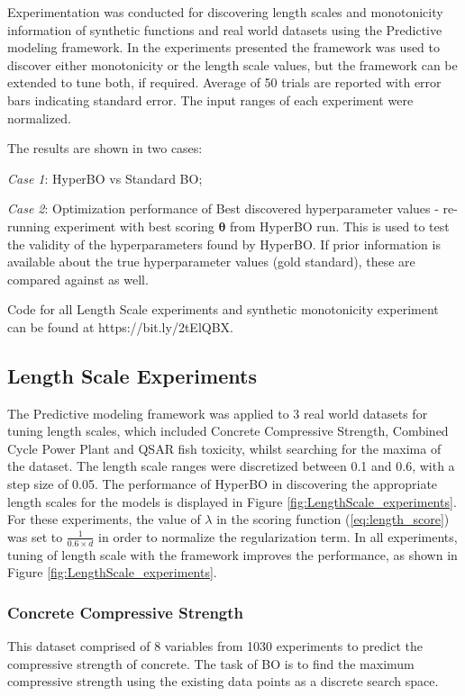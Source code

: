 Experimentation was conducted for discovering length scales and monotonicity information of synthetic functions and real world datasets using the Predictive modeling framework. In the experiments presented the framework was used to discover either monotonicity or the length scale values, but the framework can be extended to tune both, if required. Average of 50 trials are reported with error bars indicating standard error. The input ranges of each experiment were normalized. 

The results are shown in two cases: 

\textit{Case 1}: HyperBO vs Standard BO; 

\textit{Case 2}: Optimization performance of Best discovered hyperparameter values - re-running experiment with best scoring $\boldsymbol{\theta}$ from HyperBO run. This is used to test the validity of the hyperparameters found by HyperBO. If prior information is available about the true hyperparameter values (gold standard), these are compared against as well.

Code for all Length Scale experiments and synthetic monotonicity experiment can be found at https://bit.ly/2tElQBX. 
\subsection{Length Scale Experiments}
The Predictive modeling framework was applied to 3 real world datasets for tuning length scales, which included Concrete Compressive Strength, Combined Cycle Power Plant and QSAR fish toxicity, whilst searching for the maxima of the dataset. The length scale ranges were discretized between 0.1 and 0.6, with a step size of 0.05.  The performance of HyperBO in discovering the appropriate length scales for the models is displayed in Figure \ref{fig:LengthScale_experiments}. For these  experiments, the value of $\lambda$ in the scoring function (\ref{eq:length_score}) was set to $\frac{1}{ 0.6 \times d}$ in order to normalize the regularization term. In all experiments, tuning of length scale with the framework improves the performance, as shown in Figure \ref{fig:LengthScale_experiments}.

\subsubsection{Concrete Compressive Strength}
This dataset comprised of 8 variables from 1030 experiments to predict the compressive strength of concrete. The task of BO is to find the maximum compressive strength using the existing data points as a discrete search space.

